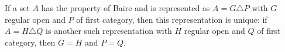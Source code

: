If a set $A$ has the property of Baire and is represented as $A = G \triangle P$ with $G$ regular open and $P$ of first category, then this representation is unique: if $A = H \triangle Q$ is another such representation with $H$ regular open and $Q$ of first category, then $G = H$ and $P = Q$.
